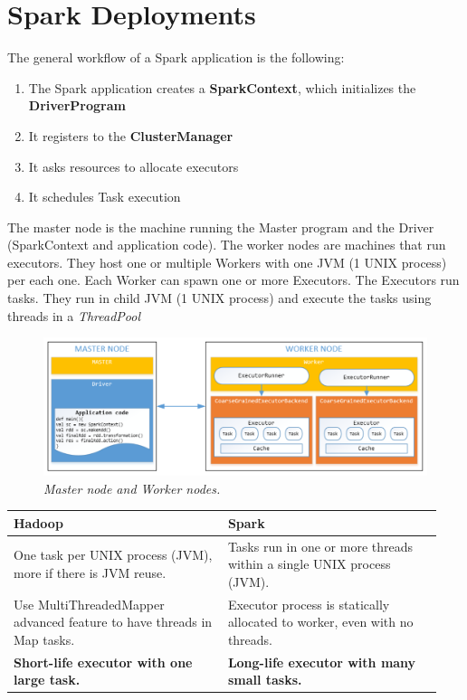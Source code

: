 \section{Spark Deployments}
	\par
	The general workflow of a Spark application is the following:
	\begin{enumerate}
		\item The Spark application creates a \textbf{SparkContext}, which initializes the \textbf{DriverProgram}
		\item It registers to the \textbf{ClusterManager}
		\item It asks resources to allocate executors
		\item It schedules Task execution
	\end{enumerate}
	The master node is the machine running the Master program and the Driver (SparkContext and application code).
	\newline
	The worker nodes are machines that run executors. They host one or multiple Workers with one JVM (1 UNIX process) per each one. Each Worker can spawn one or more Executors.
	\newline
	The Executors run tasks. They run in child JVM (1 UNIX process) and execute the tasks using threads in a \textit{ThreadPool}
	\begin{figure}[H]
		\centering
		\includegraphics[width=\linewidth]{images/masterworker.png}
		\caption{\textit{Master node and Worker nodes.}}
	\end{figure}
	\begin{table}[H]
		\centering
		\begin{tabular}{p{0.47\linewidth}p{0.47\linewidth}}
			\textbf{Hadoop} & \textbf{Spark} \\ \hline
			One task per UNIX process (JVM), more if there is JVM reuse. & Tasks run in one or more threads within a single UNIX process (JVM). \\ \hline
			Use MultiThreadedMapper advanced feature to have threads in Map tasks. & Executor process is statically allocated to worker, even with no threads. \\ \hline
			\textbf{Short-life executor with one large task.} & \textbf{Long-life executor with many small tasks.} \\ \hline
		\end{tabular}
	\end{table}
